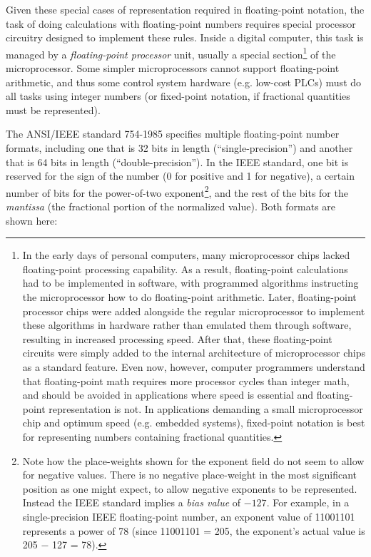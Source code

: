 Given these special cases of representation required in floating-point notation, the task of doing calculations with floating-point numbers requires special processor circuitry designed to implement these rules.  Inside a digital computer, this task is managed by a \textit{floating-point processor} unit, usually a special section\footnote{In the early days of personal computers, many microprocessor chips lacked floating-point processing capability.  As a result, floating-point calculations had to be implemented in software, with programmed algorithms instructing the microprocessor how to do floating-point arithmetic.  Later, floating-point processor chips were added alongside the regular microprocessor to implement these algorithms in hardware rather than emulated them through software, resulting in increased processing speed.  After that, these floating-point circuits were simply added to the internal architecture of microprocessor chips as a standard feature.  Even now, however, computer programmers understand that floating-point math requires more processor cycles than integer math, and should be avoided in applications where speed is essential and floating-point representation is not.  In applications demanding a small microprocessor chip and optimum speed (e.g. embedded systems), fixed-point notation is best for representing numbers containing fractional quantities.} of the microprocessor.  Some simpler microprocessors cannot support floating-point arithmetic, and thus some control system hardware (e.g. low-cost PLCs) must do all tasks using integer numbers (or fixed-point notation, if fractional quantities must be represented).

\filbreak

The ANSI/IEEE standard 754-1985 specifies multiple floating-point number formats, including one that is 32 bits in length (``single-precision'') and another that is 64 bits in length (``double-precision'').  In the IEEE standard, one bit is reserved for the sign of the number (0 for positive and 1 for negative), a certain number of bits for the power-of-two exponent\footnote{Note how the place-weights shown for the exponent field do not seem to allow for negative values.  There is no negative place-weight in the most significant position as one might expect, to allow negative exponents to be represented.  Instead the IEEE standard implies a \textit{bias value} of $-127$.  For example, in a single-precision IEEE floating-point number, an exponent value of 11001101 represents a power of 78 (since 11001101 = 205, the exponent's actual value is 205 $-$ 127 = 78).}, and the rest of the bits for the \textit{mantissa} (the fractional portion of the normalized value).  Both formats are shown here:        

